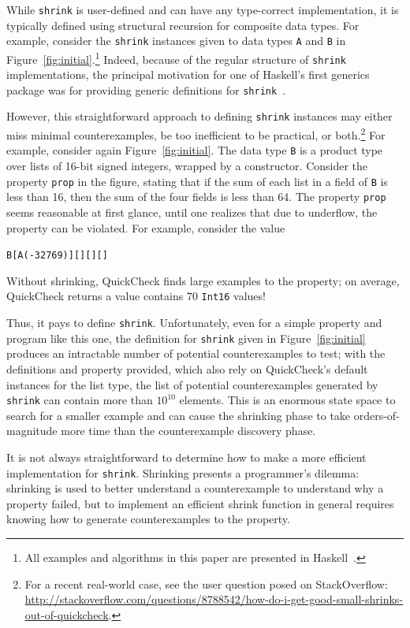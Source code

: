 \documentclass[10pt]{sigplanconf}
\newenvironment{code}{\begin{alltt}}{\end{alltt}}
\newcommand{\ttp}[1]{\texttt{#1}}
\begin{document}
While \ttp{shrink} is user-defined and can have any type-correct implementation,
it is typically defined using structural recursion for composite data types.
For example, consider the \ttp{shrink} instances given to data types \ttp{A} and
\ttp{B} in Figure~\ref{fig:initial}.\footnote{All examples and algorithms in
  this paper are presented in Haskell~\cite{haskell98}.}  Indeed, because of the regular
structure of \ttp{shrink} implementations, the principal motivation for one of
Haskell's first generics package was for providing generic definitions for
\ttp{shrink}~\cite{syb}.

However, this straightforward approach to defining \ttp{shrink} instances may
either miss minimal counterexamples, be too inefficient to be practical, or
both.\footnote{For a recent real-world case, see the user question posed on
  StackOverflow:
  \url{http://stackoverflow.com/questions/8788542/how-do-i-get-good-small-shrinks-out-of-quickcheck}.}
For example, consider again Figure~\ref{fig:initial}.  The data type \ttp{B} is
a product type over lists of 16-bit signed integers, wrapped by a constructor.
Consider the property \ttp{prop} in the figure, stating that if the sum of each
list in a field of \ttp{B} is less than 16, then the sum of the four fields is
less than 64.  The property \ttp{prop} seems reasonable at first glance, until
one realizes that due to underflow, the property can be violated.  For example,
consider the value
%
\begin{code}
B [A (-32769)] [] [] []
\end{code}
%
\noindent
Without shrinking, QuickCheck finds large examples to the property; on average,
QuickCheck returns a value contains 70 \ttp{Int16} values!

Thus, it pays to define \ttp{shrink}.  Unfortunately, even for a simple property
and program like this one, the definition for \ttp{shrink} given in
Figure~\ref{fig:initial} produces an intractable number of potential
counterexamples to test; with the definitions and property provided, which also
rely on QuickCheck's default instances for the list type, the list of potential
counterexamples generated by \ttp{shrink} can contain more than $10^{10}$
elements.  This is an enormous state space to search for a smaller example and
can cause the shrinking phase to take orders-of-magnitude more time than the
counterexample discovery phase.

It is not always straightforward to determine how to make a more efficient
implementation for \ttp{shrink}.  Shrinking presents a programmer's dilemma:
shrinking is used to better understand a counterexample to understand why a
property failed, but to implement an efficient shrink function in general
requires knowing how to generate counterexamples to the property.
\end{document}
